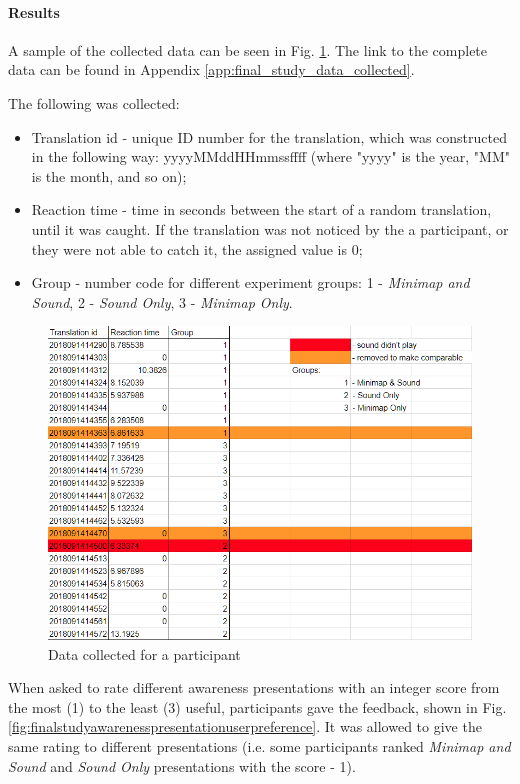 \paragraph{Results}
A sample of the collected data can be seen in Fig. \ref{fig:finalstudydataexample}. The link to the complete data can be found in Appendix \ref{app:final_study_data_collected}.

The following was collected:
\begin{itemize}
	\item Translation id - unique ID number for the translation, which was constructed in the following way: yyyyMMddHHmmssffff (where "yyyy" is the year, "MM" is the month, and so on);
	\item Reaction time - time in seconds between the start of a random translation, until it was caught. If the translation was not noticed by the a participant, or they were not able to catch it, the assigned value is 0;
	\item Group - number code for different experiment groups: 1 - \textit{Minimap and Sound}, 2 - \textit{Sound Only}, 3 - \textit{Minimap Only}.
\end{itemize}

\begin{figure}
	\centering
	\includegraphics[width=0.7\linewidth]{figures/final_study_data_example}
	\caption{Data collected for a participant}
	\label{fig:finalstudydataexample}
\end{figure}

When asked to rate different awareness presentations with an integer score from the most (1) to the least (3) useful, participants gave the feedback, shown in Fig. \ref{fig:finalstudyawarenesspresentationuserpreference}. It was allowed to give the same rating to different presentations (i.e. some participants ranked \textit{Minimap and Sound} and \textit{Sound Only} presentations with the score - 1).

